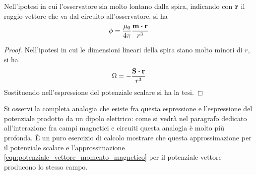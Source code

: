 \begin{cor}
    Nell'ipotesi in cui l'osservatore sia molto lontano dalla spira, indicando con $\vb{r}$ il raggio-vettore
    che va dal circuito all'osservatore, si ha
    \[
        \phi=\frac{\mu_0}{4\pi}\frac{\vb{m}\vdot\vb{r}}{r^3}
    \]
\end{cor}

\begin{proof}
    Nell'ipotesi in cui le dimensioni lineari della spira siano molto minori di $r$, si ha
    \[
        \Omega=-\frac{\vb{S}\vdot\vb{r}}{r^3}
    \]
    Sostituendo nell'espressione del potenziale scalare si ha la tesi.
\end{proof}
Si osservi la completa analogia che esiste fra questa espressione e l'espressione del potenziale prodotto da
un dipolo elettrico: come si vedrà nel paragrafo dedicato all'interazione fra campi magnetici e circuiti
questa analogia è molto più profonda.
È un puro esercizio di calcolo mostrare che questa approssimazione per il potenziale scalare e
l'approssimazione \eqref{eqn:potenziale_vettore_momento_magnetico} per il potenziale vettore
producono lo stesso campo.
